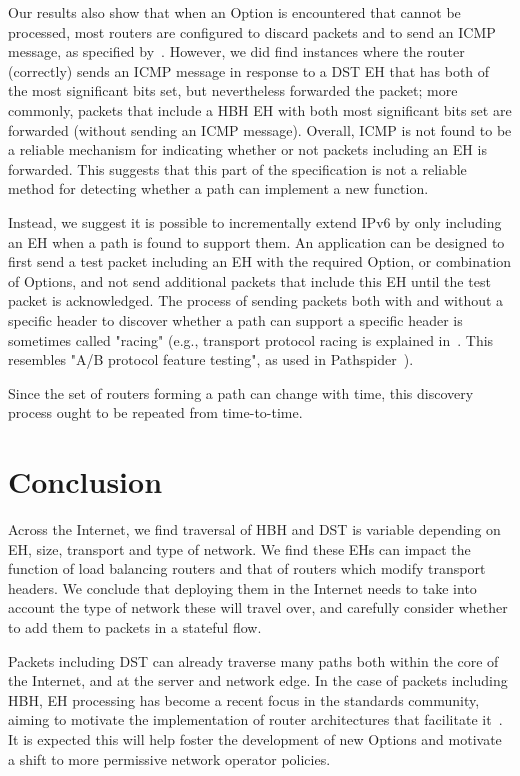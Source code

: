 \documentclass[conference]{IEEEtran}
\begin{document}
Our results also show that when an Option is encountered that cannot be processed,
most routers are configured to discard packets and to send an ICMP message, as specified by~\cite{RFC4443}. However, we did find instances where the router (correctly) sends an ICMP message in response to a DST EH that has both of the most significant bits set, but nevertheless forwarded the packet; more commonly, packets that include a HBH EH with both most significant bits set are forwarded (without sending an ICMP message). Overall, ICMP is not found to be a reliable mechanism for indicating whether or not packets including an EH is forwarded. This suggests that this part of the specification is not a  reliable method for detecting whether a path can implement a new function.

Instead, we suggest it is possible to incrementally extend IPv6 by only including an EH when a path is found to support them. 
An application can be designed to first send a test packet including an EH with the required Option, or combination of Options, and not send additional packets that include this EH until the test packet is acknowledged. The process of sending packets both with and without a specific header to discover whether a path can support a specific header is sometimes called "racing" (e.g., transport protocol racing is explained in~\cite{ietf-taps-arch-18}. This resembles "A/B protocol feature testing", as used in Pathspider~\cite{learmonth2016pathspider}).

Since the set of routers forming a path can change with time, this discovery process ought to be repeated from time-to-time. 

\section{Conclusion}
\label{sec:conclusion}

Across the Internet, we find traversal of HBH and DST is variable depending on EH, size, transport and type of network. We find these EHs can impact the function of load balancing routers and that of routers which modify transport headers. We conclude that deploying them in the Internet needs to take into account the type of network these will travel over, and carefully consider whether to add them to packets in a stateful flow.


Packets including DST can already traverse many paths both within the core of the Internet, and at the server and network edge. In the case of packets including HBH, 
EH processing has become a recent focus in the standards community, aiming to motivate the implementation of router architectures that facilitate it~\cite{ietf-6man-HBH-processing-06, ietf-v6ops-hbh-03, ietf-6man-eh-limits-02}. 
It is expected this will help foster the development of new Options and motivate a shift to more permissive network operator policies.
\end{document}
